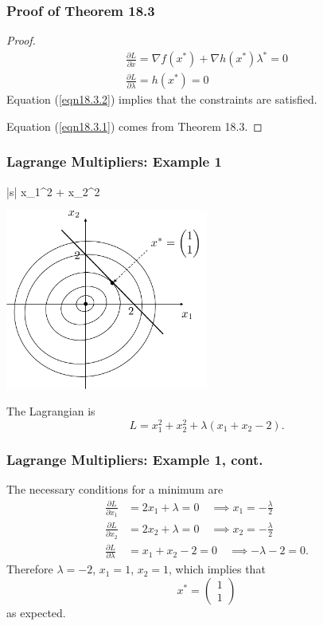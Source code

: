 \documentclass{beamer}
\begin{document}
\begin{frame}\frametitle{Proof of Theorem 18.3}
	\begin{proof}
		\begin{eqnarray}
		\label{eqn18.3.1} \frac{\partial L}{\partial x} = \nabla f(x^{\ast}) + \nabla h(x^{\ast}) \lambda^{\ast} = 0 \\
		\label{eqn18.3.2} \frac{\partial L}{\partial \lambda} = h(x^{\ast}) = 0
		\end{eqnarray}
		Equation (\ref{eqn18.3.2}) implies that the constraints are satisfied.
		
		Equation (\ref{eqn18.3.1}) comes from Theorem 18.3.
	\end{proof}
\end{frame}

\begin{frame}\frametitle{Lagrange Multipliers: Example 1}
	\begin{mini*}|s|
		{}{x_1^2 + x_2^2}{}{}
	\end{mini*}
	\begin{center}
		\includegraphics[width=0.5\textwidth]
			{figures/chap18_example1}
	\end{center}
	The Lagrangian is
	\[ 
		L = x_1^2 + x_2^2 + \lambda(x_1 + x_2 - 2). 
	\]	
\end{frame}
	
\begin{frame}\frametitle{Lagrange Multipliers: Example 1, cont.}
	The necessary conditions for a minimum are
	\begin{align*}
		\frac{\partial L}{\partial x_1} &= 2x_1 + \lambda = 0 \quad \implies x_1 = -\frac{\lambda}{2}\\
		\frac{\partial L}{\partial x_2} &= 2x_2 + \lambda = 0 \quad \implies x_2 = -\frac{\lambda}{2}\\
		\frac{\partial L}{\partial \lambda} &= x_1 + x_2 - 2 = 0 \quad \implies -\lambda - 2 = 0.
	\end{align*}
	Therefore $\lambda = -2$, $x_1 = 1$, $x_2 = 1$, which implies that 
	\[
			x^{\ast} 
				= 
				\begin{pmatrix}
	      			1 \\ 1
	    		\end{pmatrix}
	\]
	as expected.	
\end{frame}
\end{document}
